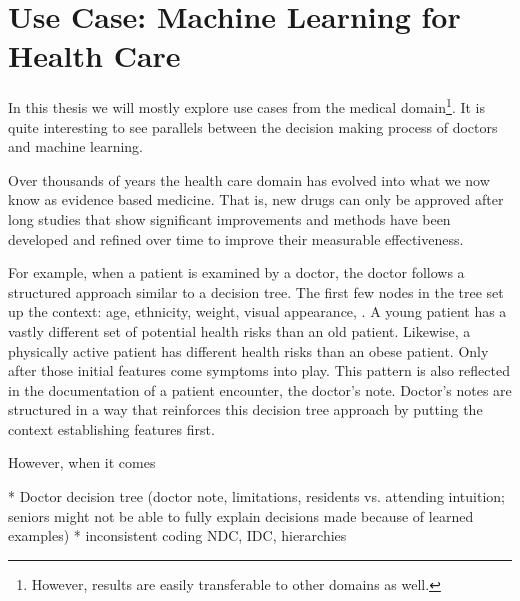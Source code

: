 \section{Use Case: Machine Learning for Health Care}
In this thesis we will mostly explore use cases from the medical domain\footnote{However, results are easily transferable to other domains as well.}.
It is quite interesting to see parallels between the decision making process of doctors and machine learning.

Over thousands of years the health care domain has evolved into what we now know as evidence based medicine.
That is, new drugs can only be approved after long studies that show significant improvements and methods have been developed and refined over time to improve their measurable effectiveness.

For example, when a patient is examined by a doctor, the doctor follows a structured approach similar to a decision tree.
The first few nodes in the tree set up the context: age, ethnicity, weight, visual appearance, \etc.
A young patient has a vastly different set of potential health risks than an old patient.
Likewise, a physically active patient has different health risks than an obese patient.
Only after those initial features come symptoms into play.
This pattern is also reflected in the documentation of a patient encounter, the doctor's note.
Doctor's notes are structured in a way that reinforces this decision tree approach by putting the context establishing features first.

However, when it comes \todo{}

* Doctor decision tree (doctor note, limitations, residents vs. attending intuition; seniors might not be able to fully explain decisions made because of learned examples)
* inconsistent coding NDC, IDC, hierarchies

